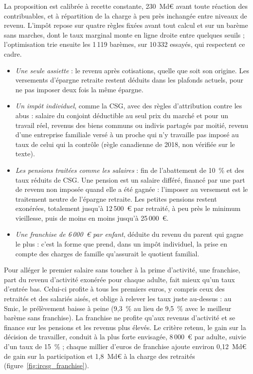 La proposition est calibrée à recette constante, 230~Md€ avant toute réaction des contribuables, et à répartition de la
charge à peu près inchangée entre niveaux de revenu. L'impôt repose sur quatre règles fixées avant tout
calcul et sur un barème sans marches, dont le taux marginal monte en ligne droite entre quelques seuils ; l'optimisation
trie ensuite les 1\,119 barèmes, sur 10\,332 essayés, qui respectent ce cadre.
\begin{itemize}\setlength{\itemsep}{1pt}
\item \emph{Une seule assiette} : le revenu après cotisations, quelle que soit son origine. Les versements d'épargne
retraite restent déduits dans les plafonds actuels, pour ne pas imposer deux fois la même épargne.
\item \emph{Un impôt individuel}, comme la CSG, avec des règles d'attribution contre les abus : salaire du conjoint
déductible au seul prix du marché et pour un travail réel, revenus des biens communs ou indivis partagés par moitié,
revenu d'une entreprise familiale versé à un proche qui n'y travaille pas imposé au taux de celui qui la contrôle
(règle canadienne de 2018, non vérifiée sur le texte).
\item \emph{Les pensions traitées comme les salaires} : fin de l'abattement de 10~\% et des taux réduits de CSG. Une
pension est un salaire différé, financé par une part de revenu non imposée quand elle a été gagnée : l'imposer au
versement est le traitement neutre de l'épargne retraite. Les petites pensions restent exonérées, totalement jusqu'à
12\,500~€ par retraité, à peu près le minimum vieillesse, puis de moins en moins jusqu'à 25\,000~€.
\item \emph{Une franchise de 6\,000~€ par enfant}, déduite du revenu du parent qui gagne le plus : c'est la forme que
prend, dans un impôt individuel, la prise en compte des charges de famille qu'assurait le quotient familial.
\end{itemize}

Pour alléger le premier salaire sans toucher à la prime d'activité, une franchise, part du revenu d'activité exonérée
pour chaque adulte, fait mieux qu'un taux d'entrée bas. Celui-ci profite à tous les premiers euros, y compris ceux des
retraités et des salariés aisés, et oblige à relever les taux juste au-dessus : au Smic, le prélèvement baisse à peine
(9,3~\% au lieu de 9,5~\% avec le meilleur barème sans franchise). La franchise ne profite qu'aux revenus d'activité et
se finance sur les pensions et les revenus plus élevés. Le critère retenu, le gain sur la décision de travailler,
conduit à la plus forte envisagée, 8\,000~€ par adulte, suivie d'un taux de 15~\% ; chaque millier d'euros de franchise
ajoute environ 0,12~Md€ de gain sur la participation et 1,8~Md€ à la charge des retraités
(figure~\ref{fig:ircsg_franchise}).

